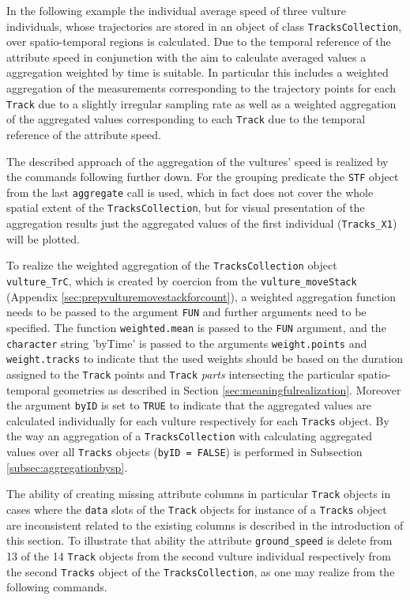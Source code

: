 \documentclass[12pt, oneside, a4paper]{scrbook}
\let\code=\texttt
\begin{document}
In the following example the individual average speed of three vulture individuals, whose trajectories are stored in an object of class \code{TracksCollection}, over spatio-temporal regions is calculated.
Due to the temporal reference of the attribute speed in conjunction with the aim to calculate averaged values a aggregation weighted by time is suitable. 
In particular this includes a weighted aggregation of the measurements corresponding to the trajectory points for each \code{Track} due to a slightly irregular sampling rate as well as a weighted aggregation of the aggregated values corresponding to each \code{Track} due to the temporal reference of the attribute speed.
\par\medskip

The described approach of the aggregation of the vultures' speed is realized by the commands following further down.
For the grouping predicate the \code{STF} object from the last \code{aggregate} call is used, which in fact does not cover the whole spatial extent of the \code{TracksCollection}, but for visual presentation of the aggregation results just the aggregated values of the first individual (\code{Tracks\_X1}) will be plotted.
\par\medskip

To realize the weighted aggregation of the \code{TracksCollection} object \code{vulture\_TrC}, which is created by coercion from the \code{vulture\_moveStack} (Appendix \ref{sec:prepvulturemovestackforcount}), a weighted aggregation function needs to be passed to the argument \code{FUN} and further arguments need to be specified.
The function \code{weighted.mean} is passed to the \code{FUN} argument, and the \code{character} string 'byTime' is passed to the arguments \code{weight.points} and \code{weight.tracks} to indicate that the used weights should be based on the duration assigned to the \code{Track} points and \code{Track} \textit{parts}
intersecting the particular spatio-temporal geometries as described in Section \ref{sec:meaningfulrealization}. 
Moreover the argument \code{byID} is set to \code{TRUE} to indicate that the aggregated values are calculated individually for each vulture respectively for each \code{Tracks} object.
By the way an aggregation of a \code{TracksCollection} with calculating aggregated values over all \code{Tracks} objects (\code{byID = FALSE}) is performed in Subsection \ref{subsec:aggregationbysp}.
\par\medskip

The ability of creating missing attribute columns in particular \code{Track} objects in cases where the \code{data} slots of the \code{Track} objects for instance of a \code{Tracks} object are inconsistent related to the existing columns is described in the introduction of this section.
To illustrate that ability the attribute \code{ground\_speed} is delete from 13 of the 14 \code{Track} objects from the second vulture individual respectively from the second \code{Tracks} object of the \code{TracksCollection}, as one may realize from the following commands.
\par\medskip
\end{document}
